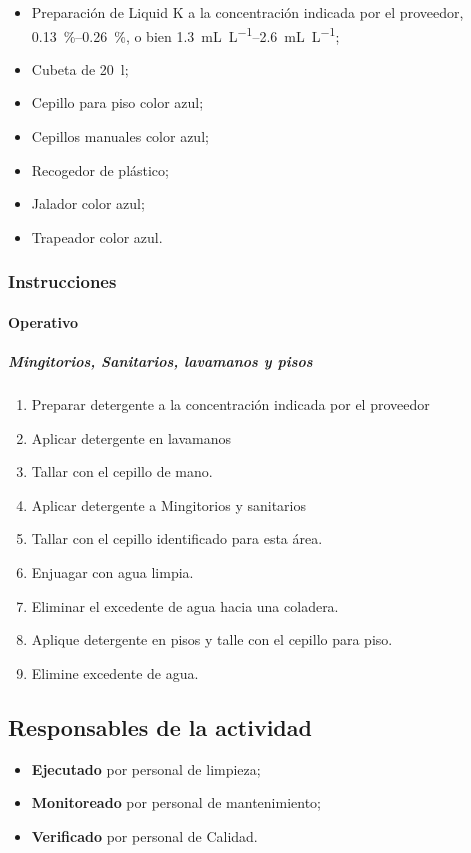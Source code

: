\begin{itemize}
	\item Preparación de Liquid K a la concentración indicada por el proveedor, \qtyrange{.13}{.26}{\percent}, o bien \qtyrange{1.3}{2.6}{\milli\liter\per\liter};
	\item Cubeta de \qty{20}{\litre};
	\item Cepillo para piso color azul;
	\item Cepillos manuales color azul;
	\item Recogedor de plástico;
	\item Jalador color azul;
	\item Trapeador color azul.
\end{itemize}

\subsubsection{Instrucciones}
\paragraph{Operativo}
\subparagraph{Mingitorios, Sanitarios, lavamanos y pisos}
\begin{enumerate}
	\item Preparar detergente a la concentración indicada por el proveedor
	\item Aplicar detergente en lavamanos
	\item Tallar con el cepillo de mano.
	\item Aplicar detergente a Mingitorios y sanitarios
	\item Tallar con el cepillo identificado para esta área.
	\item Enjuagar con agua limpia.
	\item Eliminar el excedente de agua hacia una coladera.
	\item Aplique detergente en pisos y talle con el cepillo para piso.
	\item Elimine excedente de agua.
\end{enumerate}

\subsection{Responsables de la actividad}

\begin{itemize}
	\item \textbf{Ejecutado} por personal de limpieza;
	\item \textbf{Monitoreado} por personal de mantenimiento;
	\item \textbf{Verificado} por personal de Calidad.
\end{itemize}

